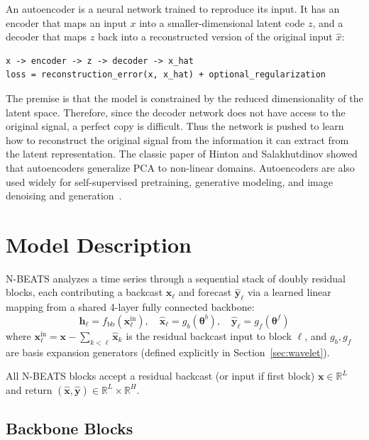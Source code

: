 \documentclass[11pt,a4paper]{article}
\begin{document}
An autoencoder is a neural network trained to reproduce its input. It has an encoder that maps an input $x$ into a smaller-dimensional latent code $z$, and a decoder that maps $z$ back into a reconstructed version of the original input $\hat{x}$:
\begin{verbatim}
x -> encoder -> z -> decoder -> x_hat
loss = reconstruction_error(x, x_hat) + optional_regularization
\end{verbatim}

The premise is that the model is constrained by the reduced dimensionality of the latent space. Therefore, since the decoder network does not have access to the original signal, a perfect copy is difficult. Thus the network is pushed to learn how to reconstruct the original signal from the information it can extract from the latent representation. The classic paper of Hinton and Salakhutdinov \citep{hinton2006reducing} showed that autoencoders generalize PCA to non-linear domains. Autoencoders are also used widely for self-supervised pretraining, generative modeling, and image denoising and generation~\citep{vincent2008denoising}.


\section{Model Description}
\label{sec:method}

N-BEATS \citep{oreshkin2020nbeats} analyzes a time series through a sequential stack of doubly residual blocks, each contributing a backcast $\hat{\mathbf{x}}_{\ell}$ and forecast $\hat{\mathbf{y}}_{\ell}$ via a learned linear mapping from a shared 4-layer fully connected backbone:
\begin{equation*}
\mathbf{h}_{\ell} = f_{\text{bb}}(\mathbf{x}_{\ell}^{\text{in}}), \quad \hat{\mathbf{x}}_{\ell} = g_b(\boldsymbol{\theta}^b), \quad \hat{\mathbf{y}}_{\ell} = g_f(\boldsymbol{\theta}^f)
\end{equation*}
where $\mathbf{x}_{\ell}^{\text{in}} = \mathbf{x} - \sum_{k < \ell}\hat{\mathbf{x}}_k$ is the residual backcast input to block $\ell$, and $g_b, g_f$ are basis expansion generators (defined explicitly in Section~\ref{sec:wavelet}).

All N-BEATS blocks accept a residual backcast (or input if first block) $\mathbf{x} \in \mathbb{R}^L$ and return $(\hat{\mathbf{x}}, \hat{\mathbf{y}}) \in \mathbb{R}^L \times \mathbb{R}^H$.

\subsection{Backbone Blocks}
\end{document}
